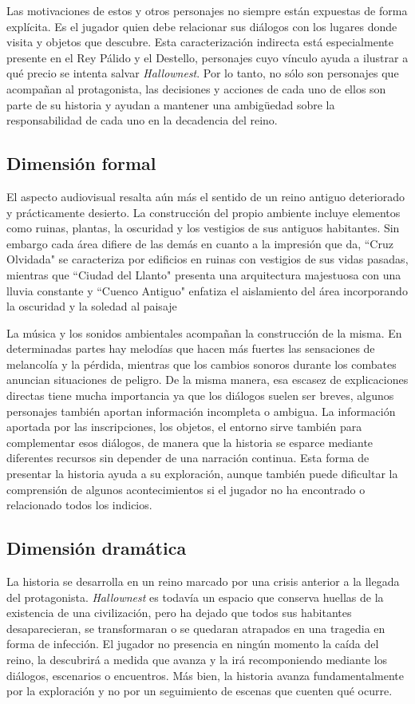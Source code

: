 \documentclass[12pt,a4paper]{article}
\begin{document}
Las motivaciones de estos y otros personajes no siempre están expuestas de forma explícita. Es el jugador quien debe relacionar sus diálogos con los lugares donde visita y objetos que descubre. Esta caracterización indirecta está especialmente presente en el Rey Pálido y el Destello, personajes cuyo vínculo ayuda a ilustrar a qué precio se intenta salvar \textit{Hallownest}. Por lo tanto, no sólo son personajes que acompañan al protagonista, las decisiones y acciones de cada uno de ellos son parte de su historia y ayudan a mantener una ambigüedad sobre la responsabilidad de cada uno en la decadencia del reino.

\subsection{Dimensión formal}
El aspecto audiovisual resalta aún más el sentido de un reino antiguo deteriorado y prácticamente desierto. La construcción del propio ambiente incluye elementos como ruinas, plantas, la oscuridad y los vestigios de sus antiguos habitantes. Sin embargo cada área difiere de las demás en cuanto a la impresión que da, ``Cruz Olvidada" se caracteriza por edificios en ruinas con vestigios de sus vidas pasadas, mientras que ``Ciudad del Llanto" presenta una arquitectura majestuosa con una lluvia constante y ``Cuenco Antiguo" enfatiza el aislamiento del área incorporando la oscuridad y la soledad al paisaje

La música y los sonidos ambientales acompañan la construcción de la misma. En determinadas partes hay melodías que hacen más fuertes las sensaciones de melancolía y la pérdida, mientras que los cambios sonoros durante los combates anuncian situaciones de peligro. De la misma manera, esa escasez de explicaciones directas tiene mucha importancia ya que los diálogos suelen ser breves, algunos personajes también aportan información incompleta o ambigua. La información aportada por las inscripciones, los objetos, el entorno sirve también para complementar esos diálogos, de manera que la historia se esparce mediante diferentes recursos sin depender de una narración continua. Esta forma de presentar la historia ayuda a su exploración, aunque también puede dificultar la comprensión de algunos acontecimientos si el jugador no ha encontrado o relacionado todos los indicios.

\subsection{Dimensión dramática}
La historia se desarrolla en un reino marcado por una crisis anterior a la llegada del protagonista. \textit{Hallownest} es todavía un espacio que conserva huellas de la existencia de una civilización, pero ha dejado que todos sus habitantes desaparecieran, se transformaran o se quedaran atrapados en una tragedia en forma de infección. El jugador no presencia en ningún momento la caída del reino, la descubrirá a medida que avanza y la irá recomponiendo mediante los diálogos, escenarios o encuentros. Más bien, la historia avanza fundamentalmente por la exploración y no por un seguimiento de escenas que cuenten qué ocurre.
\end{document}
